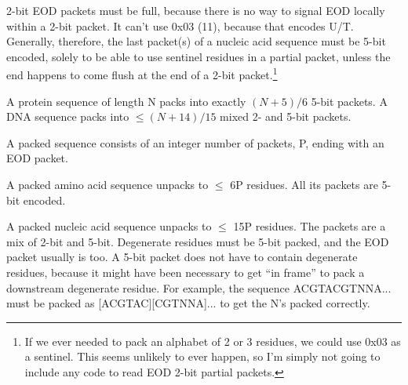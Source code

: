 2-bit EOD packets must be full, because there is no way to signal EOD
locally within a 2-bit packet. It can't use 0x03 (11), because that
encodes U/T. Generally, therefore, the last packet(s) of a nucleic
acid sequence must be 5-bit encoded, solely to be able to use sentinel
residues in a partial packet, unless the end happens to come flush at
the end of a 2-bit packet.\footnote{If we ever needed to pack an
  alphabet of 2 or 3 residues, we could use 0x03 as a sentinel.  This
  seems unlikely to ever happen, so I'm simply not going to include
  any code to read EOD 2-bit partial packets.}

A protein sequence of length N packs into exactly $(N+5)/6$ 5-bit
packets. A DNA sequence packs into $\leq (N+14)/15$ mixed 2- and 5-bit
packets.

A packed sequence consists of an integer number of packets, P, ending
with an EOD packet.
 
A packed amino acid sequence unpacks to $\leq$ 6P residues. All its
packets are 5-bit encoded.
 
A packed nucleic acid sequence unpacks to $\leq$ 15P residues.  The
packets are a mix of 2-bit and 5-bit. Degenerate residues must be
5-bit packed, and the EOD packet usually is too. A 5-bit packet does
not have to contain degenerate residues, because it might have been
necessary to get ``in frame'' to pack a downstream degenerate
residue. For example, the sequence ACGTACGTNNA... must be packed as
[ACGTAC][CGTNNA]... to get the N's packed correctly.
 

